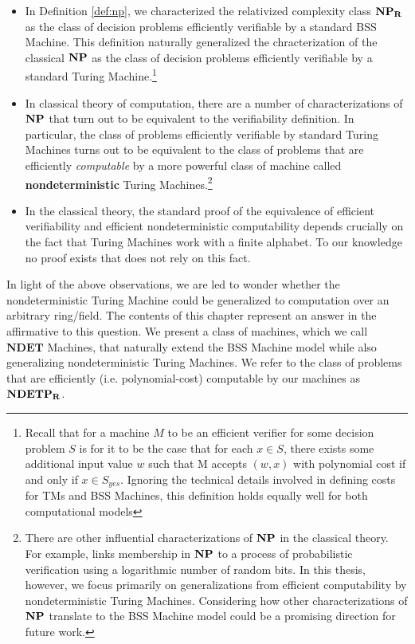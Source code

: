 \begin{itemize}

\item In Definition \ref{def:np}, we characterized the relativized
  complexity class $\mathbf{NP_R}$ as the class of decision problems efficiently
  verifiable by a standard BSS Machine.  This definition naturally
  generalized the chracterization of the classical $\mathbf{NP}$ as the
  class of decision problems efficiently verifiable by a standard
  Turing Machine.\footnote{Recall that for a machine $M$ to be an
    efficient verifier for some decision problem $S$ is for it to be
    the case that for each $x \in S$, there exists some additional
    input value $w$ such that M accepts $(w, x)$ with polynomial cost
    if and only if $x \in S_{yes}$.  Ignoring the technical details
    involved in defining costs for TMs and BSS Machines, this
    definition holds equally well for both computational models}
  
\item In classical theory of computation, there are a number of
  characterizations of $\mathbf{NP}$ that turn out to be equivalent to the
  verifiability definition.  In particular, the class of problems
  efficiently verifiable by standard Turing Machines turns out to be
  equivalent to the class of problems that are efficiently
  \emph{computable} by a more powerful class of machine called
  \textbf{nondeterministic} Turing Machines.\footnote{There are other
    influential characterizations of $\mathbf{NP}$ in the classical theory.
    For example, \cite{AS98} links membership in $\mathbf{NP}$ to a process
    of probabilistic verification using a logarithmic number of random
    bits.  In this thesis, however, we focus primarily on
    generalizations from efficient computability by nondeterministic
    Turing Machines.  Considering how other characterizations of
    $\mathbf{NP}$ translate to the BSS Machine model could be a promising
    direction for future work.}

\item In the classical theory, the standard proof of the equivalence
  of efficient verifiability and efficient nondeterministic
  computability depends crucially on the fact that Turing Machines
  work with a finite alphabet.  To our knowledge no proof exists that
  does not rely on this fact.
\end{itemize}

In light of the above observations, we are led to wonder whether the
nondeterministic Turing Machine could be generalized to computation
over an arbitrary ring/field.  The contents of this chapter represent
an answer in the affirmative to this question.  We present a class of
machines, which we call $\mathbf{NDET}$ Machines, that naturally
extend the BSS Machine model while also generalizing nondeterministic
Turing Machines.  We refer to the class of problems that are
efficiently (i.e. polynomial-cost) computable by our machines as
$\mathbf{NDETP_R}$.\\

